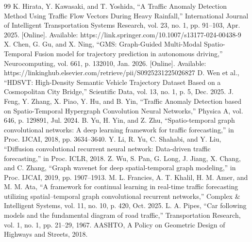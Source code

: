 \begin{thebibliography}{99}
 K. Hirata, Y. Kawasaki, and T. Yoshida, “A Traffic Anomaly Detection Method Using Traffic Flow Vectors During Heavy Rainfall,” International Journal of Intelligent Transportation Systems Research, vol. 23, no. 1, pp. 91–103, Apr. 2025. [Online]. Available: https://link.springer.com/10.1007/s13177-024-00438-9
 X. Chen, G. Gu, and X. Ning, “GMS: Graph-Guided Multi-Modal Spatio- Temporal Fusion model for trajectory prediction in autonomous driving,” Neurocomputing, vol. 661, p. 132010, Jan. 2026. [Online]. Available: https://linkinghub.elsevier.com/retrieve/pii/S0925231225026827
 D. Wen et al., “HDSVT: High-Density Semantic Vehicle Trajectory Dataset Based on a Cosmopolitan City Bridge,” Scientific Data, vol. 13, no. 1, p. 5, Dec. 2025.
 J. Feng, Y. Zhang, X. Piao, Y. Hu, and B. Yin, “Traffic Anomaly Detection based on Spatio-Temporal Hypergraph Convolution Neural Networks,” Physica A, vol. 646, p. 129891, Jul. 2024.
 B. Yu, H. Yin, and Z. Zhu, “Spatio-temporal graph convolutional networks: A deep learning framework for traffic forecasting,” in Proc. IJCAI, 2018, pp. 3634–3640.
 Y. Li, R. Yu, C. Shahabi, and Y. Liu, “Diffusion convolutional recurrent neural network: Data-driven traffic forecasting,” in Proc. ICLR, 2018.
 Z. Wu, S. Pan, G. Long, J. Jiang, X. Chang, and C. Zhang, “Graph wavenet for deep spatial-temporal graph modeling,” in Proc. IJCAI, 2019, pp. 1907–1913.
 M. L. Francies, A. T. Khalil, H. M. Amer, and M. M. Ata, “A framework for continual learning in real-time traffic forecasting utilizing spatial–temporal graph convolutional recurrent networks,” Complex \& Intelligent Systems, vol. 11, no. 10, p. 420, Oct. 2025.
 L. A. Pipes, “Car following models and the fundamental diagram of road traffic,” Transportation Research, vol. 1, no. 1, pp. 21–29, 1967.
 AASHTO, A Policy on Geometric Design of Highways and Streets, 2018.
\end{thebibliography}